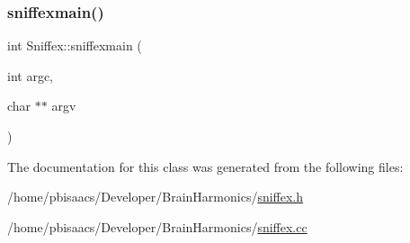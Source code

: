 \mbox{\label{classSniffex_a41e146d588c285c94c0beee223d8552b}} 
\subsubsection{\texorpdfstring{sniffexmain()}{sniffexmain()}}
{\footnotesize\ttfamily int Sniffex\+::sniffexmain (\begin{DoxyParamCaption}\item[{int}]{argc,  }\item[{char $\ast$$\ast$}]{argv }\end{DoxyParamCaption})}



The documentation for this class was generated from the following files\+:\begin{DoxyCompactItemize}
\item 
/home/pbisaacs/\+Developer/\+Brain\+Harmonics/\mbox{\hyperlink{sniffex_8h}{sniffex.\+h}}\item 
/home/pbisaacs/\+Developer/\+Brain\+Harmonics/\mbox{\hyperlink{sniffex_8cc}{sniffex.\+cc}}\end{DoxyCompactItemize}
